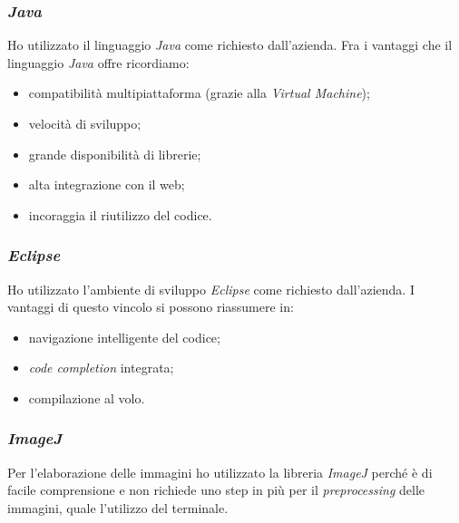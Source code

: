 \subsubsection*{\emph{Java}}
\label{3.3.3.1}
Ho utilizzato il linguaggio \emph{Java} come richiesto dall'azienda. Fra i vantaggi che il linguaggio \emph{Java} offre ricordiamo:
\begin{itemize}
\item compatibilità multipiattaforma (grazie alla \emph{Virtual Machine});
\item velocità di sviluppo;
\item grande disponibilità di librerie;
\item alta integrazione con il web;
\item incoraggia il riutilizzo del codice.
\end{itemize}

\subsubsection*{\emph{Eclipse}}
\label{3.3.3.2}
Ho utilizzato l'ambiente di sviluppo \emph{Eclipse} come richiesto dall'azienda. I vantaggi di questo vincolo si possono riassumere in:
\begin{itemize}
\item navigazione intelligente del codice;
\item \emph{code completion} integrata;
\item compilazione al volo.
\end{itemize}

\subsubsection*{\emph{ImageJ}}
\label{3.3.3.3}
Per l'elaborazione delle immagini ho utilizzato la libreria \emph{ImageJ} perché è di facile comprensione e non richiede uno step in più per il \emph{preprocessing} delle immagini, quale l'utilizzo del terminale.

